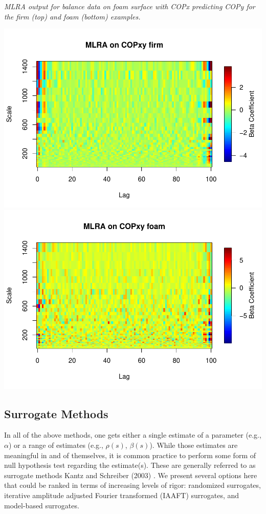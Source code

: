 \documentclass[
  man]{apa6}
\begin{document}
\emph{MLRA output for balance data on foam surface with COPx predicting COPy
for the firm (top) and foam (bottom) examples.}

\includegraphics{fractal_regression_paper_brm_files/figure-latex/unnamed-chunk-27-1.pdf} \includegraphics{fractal_regression_paper_brm_files/figure-latex/unnamed-chunk-27-2.pdf}

\hypertarget{surrogate-methods}{%
\subsection{Surrogate Methods}\label{surrogate-methods}}

In all of the above methods, one gets either a single estimate of a
parameter (e.g., \(\alpha\)) or a range of estimates (e.g., \(\rho(s)\),
\(\beta(s)\)). While those estimates are meaningful in and of themselves,
it is common practice to perform some form of null hypothesis test
regarding the estimate(s). These are generally referred to as surrogate
methods Kantz and Schreiber (2003) . We present several options here that could be
ranked in terms of increasing levels of rigor: randomized surrogates,
iterative amplitude adjusted Fourier transformed (IAAFT) surrogates, and
model-based surrogates.
\end{document}

